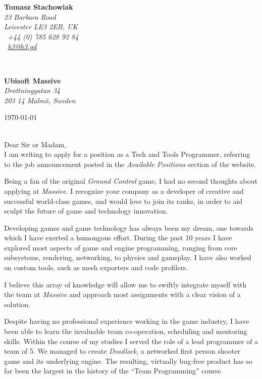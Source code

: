 \documentclass[11pt]{article}
\begin{document}
\hfill%
\begin{minipage}[t]{.6\textwidth}
\raggedleft%
{\bfseries Tomasz Stachowiak}\\[.35ex]
\small\itshape%
23 Barbara Road\\
Leicester LE3 2EB, UK\\[.35ex]
\Telefon~+44 (0) 785 628 92 84\\
\Letter~\href{mailto:h3@h3.gd}{h3@h3.gd}
\end{minipage}\\[1em]
%
\begin{minipage}[t]{.4\textwidth}
\raggedright%
{\bfseries Ubisoft Massive}\\[.35ex]
\small\itshape%
Drottninggatan 34\\
203 14 Malmö, Sweden
\end{minipage}
\hfill %
\begin{minipage}[t]{.4\textwidth}
\raggedleft %
\today
\end{minipage}\\[2em]
Dear Sir or Madam,\\[1.5em]


I am writing to apply for a position as a Tech and Tools Programmer, referring to the job announcement posted in the \emph{Available Positions} section of the website.

Being a fan of the original \emph{Ground Control} game, I had no second thoughts about applying at \emph{Massive}. I recognize your company as a developer of creative and successful world-class games, and would love to join its ranks, in order to aid sculpt the future of game and technology innovation.

Developing games and game technology has always been my dream, one towards which I have exerted a humongous effort. During the past 10 years I have explored most aspects of game and engine programming, ranging from core subsystems, rendering, networking, to physics and gameplay. I have also worked on custom tools, such as mesh exporters and code profilers.

I believe this array of knowledge will allow me to swiftly integrate myself with the team at \emph{Massive} and approach most assignments with a clear vision of a solution.

Despite having no professional experience working in the game industry, I have been able to learn the invaluable team co-operation, scheduling and mentoring skills. Within the course of my studies I served the role of a lead programmer of a team of 5. We managed to create \emph{Deadlock}, a networked first person shooter game and its underlying engine. The resulting, virtually bug-free product has so far been the largest in the history of the ``Team Programming'' course.
\end{document}
